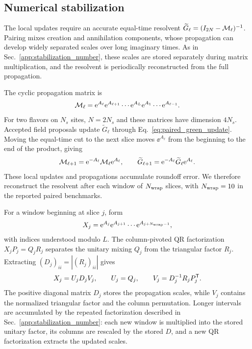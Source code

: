 \subsection{Numerical stabilization}
\label{app:stabilization_paired}

The local updates require an accurate equal-time resolvent $\widetilde G_\ell=(I_{2N}-\mathcal{M}_\ell)^{-1}$. Pairing mixes creation and annihilation components, whose propagation can develop widely separated scales over long imaginary times. As in Sec.~\ref{app:stabilization_number}, these scales are stored separately during matrix multiplication, and the resolvent is periodically reconstructed from the full propagation.

The cyclic propagation matrix is
\begin{equation}
    \mathcal{M}_\ell=\mathrm{e}^{A_\ell}\mathrm{e}^{A_{\ell+1}}\cdots\mathrm{e}^{A_L}\mathrm{e}^{A_1}\cdots\mathrm{e}^{A_{\ell-1}}.
\end{equation}
For two flavors on $N_s$ sites, $N=2N_s$ and these matrices have dimension $4N_s$. Accepted field proposals update $\widetilde G_\ell$ through Eq.~\eqref{eq:paired_green_update}. Moving the equal-time cut to the next slice moves $\ee^{A_\ell}$ from the beginning to the end of the product, giving
\begin{equation}
    \mathcal{M}_{\ell+1}=\mathrm{e}^{-A_\ell}\mathcal{M}_\ell\mathrm{e}^{A_\ell},
    \qquad
    \widetilde G_{\ell+1}=\mathrm{e}^{-A_\ell}\widetilde G_\ell\mathrm{e}^{A_\ell}.
\end{equation}
These local updates and propagations accumulate roundoff error. We therefore reconstruct the resolvent after each window of $N_{\rm wrap}$ slices, with $N_{\rm wrap}=10$ in the reported paired benchmarks.

For a window beginning at slice $j$, form
\begin{equation}
    X_j=\mathrm{e}^{A_j}\mathrm{e}^{A_{j+1}}\cdots\mathrm{e}^{A_{j+N_{\rm wrap}-1}},
\end{equation}
with indices understood modulo $L$. The column-pivoted QR factorization $X_jP_j=Q_jR_j$ separates the unitary mixing $Q_j$ from the triangular factor $R_j$. Extracting $(D_j)_{ii}=|(R_j)_{ii}|$ gives
\begin{equation}
    X_j=U_jD_jV_j,
    \qquad U_j=Q_j,
    \qquad V_j=D_j^{-1}R_jP_j^{\mathsf{T}}.
\end{equation}
The positive diagonal matrix $D_j$ stores the propagation scales, while $V_j$ contains the normalized triangular factor and the column permutation. Longer intervals are accumulated by the repeated factorization described in Sec.~\ref{app:stabilization_number}: each new window is multiplied into the stored unitary factor, its columns are rescaled by the stored $D$, and a new QR factorization extracts the updated scales.

